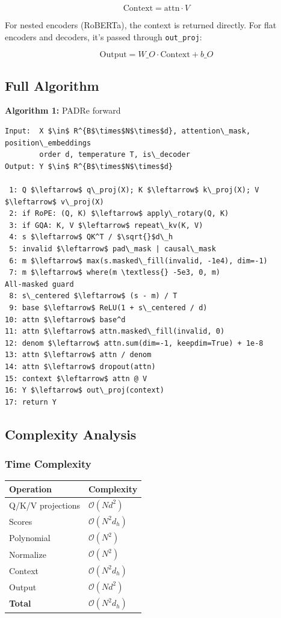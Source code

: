 \[
\text{Context} = \text{attn} \cdot V
\tag{4.11}
\]

For nested encoders (RoBERTa), the context is returned directly. For flat 
encoders and decoders, it's passed through \texttt{out\_proj}:

\[
\text{Output} = W\_O \cdot \text{Context} + b\_O
\tag{4.12}
\]

\subsection{Full Algorithm}

\textbf{Algorithm 1:} PADRe forward
\begin{lstlisting}
Input:  X $\in$ R^{B$\times$N$\times$d}, attention\_mask, position\_embeddings
        order d, temperature T, is\_decoder
Output: Y $\in$ R^{B$\times$N$\times$d}

 1: Q $\leftarrow$ q\_proj(X); K $\leftarrow$ k\_proj(X); V $\leftarrow$ v\_proj(X)
 2: if RoPE: (Q, K) $\leftarrow$ apply\_rotary(Q, K)
 3: if GQA: K, V $\leftarrow$ repeat\_kv(K, V)
 4: s $\leftarrow$ QK^T / $\sqrt{}$d\_h
 5: invalid $\leftarrow$ pad\_mask | causal\_mask
 6: m $\leftarrow$ max(s.masked\_fill(invalid, -1e4), dim=-1)
 7: m $\leftarrow$ where(m \textless{} -5e3, 0, m)                          All-masked guard
 8: s\_centered $\leftarrow$ (s - m) / T
 9: base $\leftarrow$ ReLU(1 + s\_centered / d)
10: attn $\leftarrow$ base^d
11: attn $\leftarrow$ attn.masked\_fill(invalid, 0)
12: denom $\leftarrow$ attn.sum(dim=-1, keepdim=True) + 1e-8
13: attn $\leftarrow$ attn / denom
14: attn $\leftarrow$ dropout(attn)
15: context $\leftarrow$ attn @ V
16: Y $\leftarrow$ out\_proj(context)
17: return Y
\end{lstlisting}

\subsection{Complexity Analysis}

\subsubsection{Time Complexity}

\begin{table}[H]
\centering
\small
\begin{tabular}{ll}
\toprule
\textbf{Operation} & \textbf{Complexity} \\
\midrule
Q/K/V projections & $\mathcal{O}(N d^2)$ \\
Scores & $\mathcal{O}(N^2 d_h)$ \\
Polynomial & $\mathcal{O}(N^2)$ \\
Normalize & $\mathcal{O}(N^2)$ \\
Context & $\mathcal{O}(N^2 d_h)$ \\
Output & $\mathcal{O}(N d^2)$ \\
\textbf{Total} & $\mathcal{O}(N^2 d_h)$ \\
\bottomrule
\end{tabular}
\end{table}

